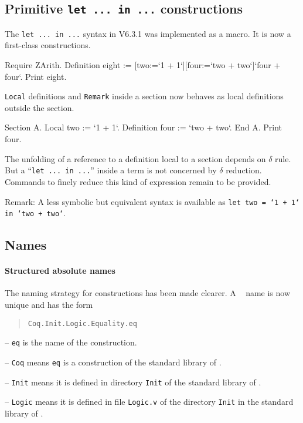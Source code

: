 \documentclass[11pt]{article}
\begin{document}
\label{Language}
\subsection{Primitive {\tt let ... in ...} constructions}
\label{Letin}
The {\tt let ... in ...} syntax in V6.3.1 was implemented as a
macro. It is now a first-class constructions.

\begin{coq_example}
Require ZArith.
Definition eight := [two:=`1 + 1`][four:=`two + two`]`four + four`. 
Print eight.
\end{coq_example}

{\tt Local} definitions and {\tt Remark} inside a section now behaves
as local definitions outside the section.

\begin{coq_example}
Section A.
Local two := `1 + 1`.
Definition four := `two + two`.
End A.
Print four.
\end{coq_example}

The unfolding of a reference to a definition local to a section
depends on $\delta$ rule. But a ``{\tt let ... in ...}'' inside a term
is not concerned by $\delta$ reduction. Commands to finely reduce this
kind of expression remain to be provided.
\medskip

Remark: A less symbolic but equivalent syntax is available as {\tt let
two = `1 + 1` in `two + two`}.

\subsection{Names}
\label{Names}

\paragraph{Structured absolute names} The naming strategy for constructions
has been made clearer. A \Coq~ name is now unique and has the form

\begin{quote}
{\tt Coq.Init.Logic.Equality.eq}
\end{quote}

-- {\tt eq} is the name of the construction.

-- {\tt Coq} means {\tt eq} is a construction of the standard library of
\Coq.

-- {\tt Init} means it is defined in directory {\tt Init} of the
standard library of \Coq.

-- {\tt Logic} means it is defined in file {\tt Logic.v} of the
directory {\tt Init} in the standard library of \Coq.
\end{document}
